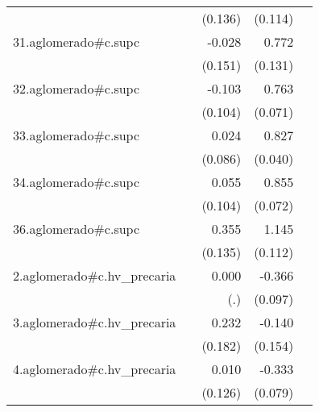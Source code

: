 {\begin{longtable}{l*{4}{D{.}{.}{-1}}}
            &                     &     (0.136)         &     (0.114)         &                     \\
\addlinespace
31.aglomerado#c.supc&                     &      -0.028         &       0.772\sym{***}&                     \\
            &                     &     (0.151)         &     (0.131)         &                     \\
\addlinespace
32.aglomerado#c.supc&                     &      -0.103         &       0.763\sym{***}&                     \\
            &                     &     (0.104)         &     (0.071)         &                     \\
\addlinespace
33.aglomerado#c.supc&                     &       0.024         &       0.827\sym{***}&                     \\
            &                     &     (0.086)         &     (0.040)         &                     \\
\addlinespace
34.aglomerado#c.supc&                     &       0.055         &       0.855\sym{***}&                     \\
            &                     &     (0.104)         &     (0.072)         &                     \\
\addlinespace
36.aglomerado#c.supc&                     &       0.355\sym{**} &       1.145\sym{***}&                     \\
            &                     &     (0.135)         &     (0.112)         &                     \\
\addlinespace
2.aglomerado#c.hv\_precaria&                     &       0.000         &      -0.366\sym{***}&                     \\
            &                     &         (.)         &     (0.097)         &                     \\
\addlinespace
3.aglomerado#c.hv\_precaria&                     &       0.232         &      -0.140         &                     \\
            &                     &     (0.182)         &     (0.154)         &                     \\
\addlinespace
4.aglomerado#c.hv\_precaria&                     &       0.010         &      -0.333\sym{***}&                     \\
            &                     &     (0.126)         &     (0.079)         &                     \\

\end{longtable}}
